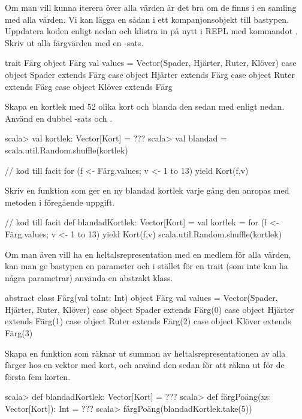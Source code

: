 \Subtask Om man vill kunna iterera över alla värden är det bra om de finns i en samling med alla värden. Vi kan lägga en sådan i ett kompanjonsobjekt till bastypen. Uppdatera koden enligt nedan och klistra in på nytt i REPL med kommandot . Skriv ut alla färgvärden med en -sats.

\begin{Code}
trait Färg
object Färg { 
  val values = Vector(Spader, Hjärter, Ruter, Klöver)
}
case object Spader extends Färg
case object Hjärter extends Färg
case object Ruter extends Färg
case object Klöver extends Färg
\end{Code}
Skapa en kortlek med 52 olika kort och blanda den sedan med  enligt nedan. Använd en dubbel -sats och .
\begin{REPL}
scala> val kortlek: Vector[Kort] = ???
scala> val blandad = scala.util.Random.shuffle(kortlek)
\end{REPL}

\begin{Code}
// kod till facit
for (f <- Färg.values; v <- 1 to 13) yield Kort(f,v)
\end{Code}

\Subtask Skriv en funktion  som ger en ny blandad kortlek varje gång den anropas med metoden i föregående uppgift.
\begin{Code}
// kod till facit
def blandadKortlek: Vector[Kort] = {
  val kortlek = 
    for (f <- Färg.values; v <- 1 to 13) yield Kort(f,v)
  scala.util.Random.shuffle(kortlek)
}
\end{Code}



\Subtask Om man även vill ha en heltalsrepresentation med en medlem  för alla värden, kan man ge bastypen en parameter och i stället för en trait (som inte kan ha några parametrar) använda en abstrakt klass.

\begin{Code}
abstract class Färg(val toInt: Int)
object Färg { 
  val values = Vector(Spader, Hjärter, Ruter, Klöver)
}
case object Spader  extends Färg(0)
case object Hjärter extends Färg(1)
case object Ruter   extends Färg(2)
case object Klöver  extends Färg(3)
\end{Code}
Skapa en funktion  som räknar ut summan av heltalsrepresentationen av alla färger hos en vektor med kort, och använd den sedan för att räkna ut  för de första fem korten.
\begin{REPL}
scala> def blandadKortlek: Vector[Kort] = ???
scala> def färgPoäng(xs: Vector[Kort]): Int = ???
scala> färgPoäng(blandadKortlek.take(5))
\end{REPL}

